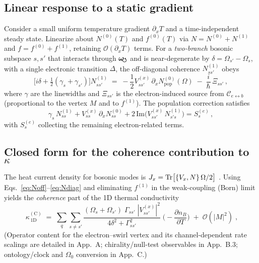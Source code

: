 \documentclass[aps,prb,preprint,amsmath,amssymb]{revtex4-2} %
\newcommand{\omegas}{\boldsymbol{\omega}_{\!\mkern-2mu\scriptstyle\boldsymbol{\circlearrowleft}}} %
\begin{document}
        \subsection{Linear response to a static gradient}
            Consider a small uniform temperature gradient $\partial_x T$ and a time-independent steady state. Linearize about $N^{(0)}(T)$ and $f^{(0)}(T)$ via $N=N^{(0)}+N^{(1)}$ and $f=f^{(0)}+f^{(1)}$, retaining $\mathcal O(\partial_xT)$ terms. For a \emph{two-branch} bosonic subspace $s,s'$ that interacts through $\omegas$ and is near-degenerate by $\delta=\Omega_{s'}-\Omega_s$, with a single electronic transition $\Delta$, the off-diagonal coherence $N^{(1)}_{ss'}$ obeys
            \begin{equation}
                \Big[i\delta + \tfrac12(\gamma_s+\gamma_{s'})\Big] N^{(1)}_{ss'}
                \;=\; -\frac{1}{2} V^{(x)}_{ss'}\, \partial_x N^{(0)}_{\mathrm{pop}}(\Omega) \; -\; \frac{i}{\hbar}\,\Xi_{ss'}\,,
                \label{eq:Noff}
            \end{equation}
            where $\gamma$ are the linewidths and $\Xi_{ss'}$ is the electron-induced source from $\mathcal C_{e\leftrightarrow b}$ (proportional to the vertex $M$ and to $f^{(1)}$). The population correction satisfies
            \begin{equation}
                \gamma_s\, N^{(1)}_{ss} + V^{(x)}_{ss}\,\partial_x N^{(0)}_{ss} + 2\,\mathrm{Im}\!\big( V^{(x)}_{ss'}\,N^{(1)}_{s's}\big) = S^{(e)}_s\,,
                \label{eq:Ndiag}
            \end{equation}
            with $S^{(e)}_s$ collecting the remaining electron-related terms.

        \subsection{Closed form for the coherence contribution to $\kappa$}
            The heat current density for bosonic modes is $J_x= \Tr\!\big[ \{V_x, N\}\,\Omega/2 \big]$ \cite{Hardy1963,Simoncelli2022}. Using Eqs.~\eqref{eq:Noff}--\eqref{eq:Ndiag} and eliminating $f^{(1)}$ in the weak-coupling (Born) limit yields the \emph{coherence} part of the 1D thermal conductivity
            \begin{equation}
                \boxed{\;\kappa^{(\mathrm C)}_{\!\,1\mathrm D}\;=\;\sum_{q}\sum_{s\neq s'} \frac{(\Omega_s+\Omega_{s'})\;\Gamma_{ss'}\; |V^{(x)}_{ss'}|^2}{4\delta^2+\Gamma_{ss'}^2}\;\bigg(-\frac{\partial n_B}{\partial T}\bigg)\; +\; \mathcal O(|M|^2)\;,}\label{eq:kC}
            \end{equation}
            (Operator content for the electron–swirl vertex and its channel-dependent rate scalings are detailed in App.~A; chirality/null-test observables in App.~B.3; ontology/clock and $\Omega_0$ conversion in App.~C.)
\end{document}
